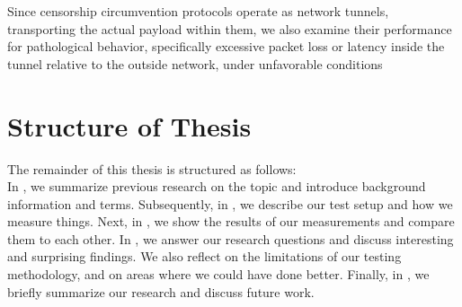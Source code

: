Since censorship circumvention protocols operate as network tunnels, transporting the actual payload within them, we also examine their performance for pathological behavior, specifically excessive packet loss or latency inside the tunnel relative to the outside network, under unfavorable conditions


\section{Structure of Thesis}
The remainder of this thesis is structured as follows:\\
In , we summarize previous research on the topic and introduce background information and terms.
Subsequently, in , we describe our test setup and how we measure things.
Next, in , we show the results of our measurements and compare them to each other.
In , we answer our research questions and discuss interesting and surprising findings.
We also reflect on the limitations of our testing methodology, and on areas where we could have done better.
Finally, in , we briefly summarize our research and discuss future work.


